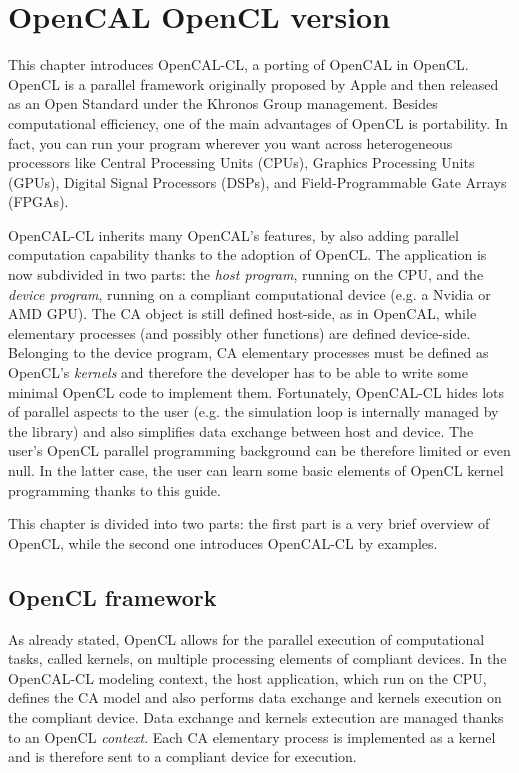 \chapter{OpenCAL OpenCL version}\label{ch:opencal-cl}


This chapter introduces OpenCAL-CL, a porting of OpenCAL in
OpenCL. OpenCL is a parallel framework originally proposed by Apple
and then released as an Open Standard under the Khronos Group
management. Besides computational efficiency, one of the main
advantages of OpenCL is portability. In fact, you can run your program
wherever you want across heterogeneous processors like Central
Processing Units (CPUs), Graphics Processing Units (GPUs), Digital
Signal Processors (DSPs), and Field-Programmable Gate Arrays (FPGAs).

OpenCAL-CL inherits many OpenCAL's features, by also adding parallel
computation capability thanks to the adoption of OpenCL. The
application is now subdivided in two parts: the \emph{host program},
running on the CPU, and the \emph{device program}, running on a
compliant computational device (e.g. a Nvidia or AMD GPU). The CA
object is still defined host-side, as in OpenCAL, while elementary
processes (and possibly other functions) are defined
device-side. Belonging to the device program, CA elementary processes
must be defined as OpenCL's \emph{kernels} and therefore the developer
has to be able to write some minimal OpenCL code to implement
them. Fortunately, OpenCAL-CL hides lots of parallel aspects to the
user (e.g. the simulation loop is internally managed by the library)
and also simplifies data exchange between host and device. The user's
OpenCL parallel programming background can be therefore limited or
even null. In the latter case, the user can learn some basic elements
of OpenCL kernel programming thanks to this guide.

This chapter is divided into two parts: the first part is a very brief
overview of OpenCL, while the second one introduces OpenCAL-CL by
examples.

\section{OpenCL framework}\label{sec:openclstructure}
As already stated, OpenCL allows for the parallel execution of
computational tasks, called kernels, on multiple processing elements
of compliant devices. In the OpenCAL-CL modeling context, the host
application, which run on the CPU, defines the CA model and also
performs data exchange and kernels execution on the compliant device.
Data exchange and kernels extecution are managed thanks to an OpenCL
\emph{context}. Each CA elementary process is implemented as a kernel
and is therefore sent to a compliant device for execution.

